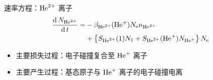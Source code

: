 \begin{frame}{速率方程：${\rm He}^{2+}$ 离子}
	\[
	\begin{aligned}
		\frac{{\rm d}\,N_{{\rm He}^{2+}}}{{\rm d}\,t}=
			&-\beta_{{\rm He}^{2+}}({\rm He}^{+})N_{\rm e}n_{{\rm He}^{2+}}\\
			&+\left\{S_{{\rm He}^{2+}}(1)N_1+S_{{\rm He}^{2+}}({\rm He}^+)N_{{\rm He}^+}\right\}N_{\rm e}
	\end{aligned}
	\]
	\begin{itemize}
		\item 主要损失过程：电子碰撞复合至 ${\rm He}^+$ 离子
		\item 主要产生过程：基态原子与 ${\rm He}^+$ 离子的电子碰撞电离
	\end{itemize}
\end{frame}



